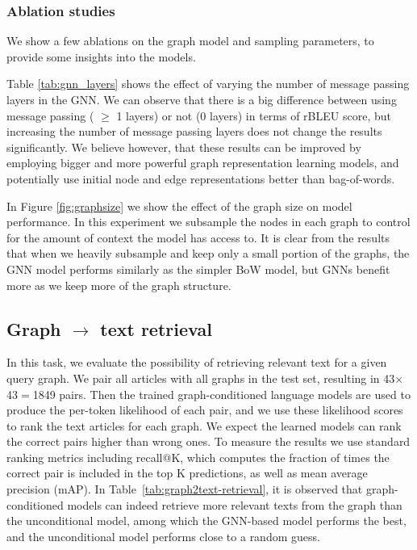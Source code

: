 \documentclass[11pt]{article}
\newcommand{\tabref}[1]{Table \ref{#1}}
\newcommand{\figref}[1]{Figure \ref{#1}}
\begin{document}
\subsubsection{Ablation studies}

We show a few ablations on the graph model and sampling parameters, to provide some insights into the models.

\tabref{tab:gnn_layers} shows the effect of varying the number of message passing layers in the GNN. 
We can observe that there is a big difference between using message passing ( $\ge$ 1 layers) or not (0 layers) in terms of rBLEU score, but increasing the number of message passing layers does not change the results significantly.  
We believe however, that these results can be improved by employing bigger and more powerful graph representation learning models, and potentially use initial node and edge representations better than bag-of-words.

In \figref{fig:graphsize} we show the effect of the graph size on model performance.  In this experiment we subsample the nodes in each graph to control for the amount of context the model has access to.  It is clear from the results that when we heavily subsample and keep only a small portion of the graphs, the GNN model performs similarly as the simpler BoW model, but GNNs benefit more as we keep more of the graph structure.






\subsection{Graph $\rightarrow$ text retrieval}
\label{sec:g2t_retrieval}
In this task, we evaluate the possibility of retrieving relevant text for a given query graph.  We pair all articles with all graphs in the test set, resulting in 43$\times$43$=$1849 pairs.
Then the trained graph-conditioned language models are used to produce the per-token likelihood of each pair, and we use these likelihood scores to rank the text articles for each graph.  We expect the learned models can rank the correct pairs higher than wrong ones. To measure the results we use standard ranking metrics including recall@K, which computes the fraction of times the correct pair is included in the top K predictions, as well as mean average precision (mAP). In Table~\ref{tab:graph2text-retrieval}, it is observed that graph-conditioned models can indeed retrieve more relevant texts from the graph than the unconditional model,
among which the GNN-based model performs the best, and the unconditional model performs close to a random guess.
\end{document}
